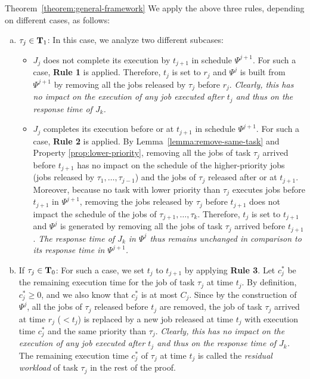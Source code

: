 \begin{appProof}{Theorem~\ref{theorem:general-framework}}
We apply the above three rules, depending on different cases, as follows:
\begin{enumerate}[(a)]
\item $\tau_j \in {\bf T}_1$: In this case, we analyze two different subcases:
\begin{itemize}
\item $J_{j}$ does not complete its execution by $t_{j+1}$ in schedule $\Psi^{j+1}$. For such a case, {\bf Rule 1} is applied. Therefore, $t_{j}$ is set to $r_j$ and $\Psi^j$ is built from $\Psi^{j+1}$ by removing all the jobs released by $\tau_j$ before $r_j$.  \emph{Clearly, this has no impact on the execution of any job executed after $t_j$ and thus on the response time of $J_k$.}
\item $J_{j}$ completes its execution before or at $t_{j+1}$ in schedule $\Psi^{j+1}$. For such a case, {\bf Rule 2} is applied.  By Lemma~\ref{lemma:remove-same-task} and Property \ref{prop:lower-priority}, removing all the jobs of task $\tau_j$ arrived before $t_{j+1}$ has no impact on the schedule of the higher-priority jobs (jobs released by $\tau_1, \ldots, \tau_{j-1}$) and the jobs of $\tau_j$ released after or at $t_{j+1}$. 
Moreover, because no task with lower priority than $\tau_j$ executes jobs before $t_{j+1}$ in $\Psi^{j+1}$, removing the jobs released by $\tau_j$ before $t_{j+1}$ does not impact the schedule of the jobs of $\tau_{j+1}, \ldots, \tau_{k}$. Therefore, $t_j$ is set to $t_{j+1}$ and $\Psi^j$ is generated by removing all the jobs of task $\tau_j$ arrived before $t_{j+1}$. \emph{The response time of $J_{k}$ in $\Psi^j$ thus remains unchanged in comparison to its response time in $\Psi^{j+1}$.}
\end{itemize}
\item If $\tau_j \in {\bf T}_0$: For such a case, we set $t_{j}$ to $t_{j+1}$ by applying {\bf Rule 3}. Let $c_j^*$ be the remaining execution time for the job of task $\tau_j$ at time $t_j$. By definition, $c_j^* \geq 0$, and we also know that $c_j^*$ is at most $C_j$. Since by the construction of $\Psi^j$, all the jobs of $\tau_j$ released before $t_j$ are removed, the job of task $\tau_j$ arrived at time $r_j$ ($< t_j$) is replaced by a new job released at time $t_j$ with execution time $c_j^*$ and the same priority than $\tau_j$. \emph{Clearly, this has no impact on the execution of any job executed after $t_j$ and thus on the response time of $J_k$.} The remaining execution time $c_j^*$ of $\tau_j$ at time $t_j$ is called the \emph{residual workload} of task $\tau_j$ in the rest of the proof.
\end{enumerate}


\end{appProof}
